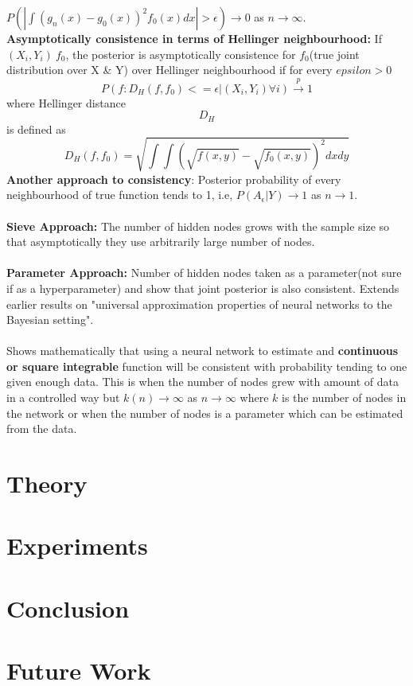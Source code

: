 \documentclass[a4paper,twocolumn]{article}
\begin{document}
\( P(|\int(\hat{g_n}(x) - g_0(x))^2f_0(x)dx| > \epsilon) \xrightarrow{} 0 \) as \( n \xrightarrow{} \infty\).
\\
\textbf{Asymptotically consistence in terms of Hellinger neighbourhood:} If \( (X_i, Y_i) ~ f_0 \), the posterior is asymptotically consistence for \(f_0\)(true joint distribution over X \& Y) over Hellinger neighbourhood if for every \(epsilon>0\)
\begin{equation}
    P({f: D_H(f,f_0) <= \epsilon}|(X_i, Y_i) \forall i) \xrightarrow{p} 1
\end{equation}
where Hellinger distance $$D_H$$ is defined as 
\begin{equation*}
    D_H(f, f_0) = \sqrt{\int\int(\sqrt{f(x, y)}-\sqrt{f_0(x, y)})^2 dx dy}
\end{equation*}
\textbf{Another approach to consistency}: Posterior probability of every neighbourhood of true function tends to 1, i.e, \(P(A_\epsilon|Y) \longrightarrow 1\) as \(n\xrightarrow{}1\).
\\\\
\textbf{Sieve Approach:} The number of hidden nodes grows with the sample size so that asymptotically they use arbitrarily large number of nodes.
\\\\
\textbf{Parameter Approach:} Number of hidden nodes taken as a parameter(not sure if as a hyperparameter) and show that joint posterior is also consistent.
Extends earlier results on "universal approximation properties of neural networks to the Bayesian setting".
\\\\
Shows mathematically that using a neural network to estimate and \textbf{continuous or square integrable} function will be consistent with probability tending to one given enough data. This is when the number of nodes grew with amount of data in a controlled way but \(k(n) \xrightarrow{} \infty\) as \(n \xrightarrow{} \infty\) where \(k\) is the number of nodes in the network or when the number of nodes is a parameter which can be estimated from the data.    

\section{Theory}
\label{sec-4}

\section{Experiments}
\label{sec-5}

\section{Conclusion}
\label{sec-6}

\section{Future Work}
\label{sec-7}
\end{document}
